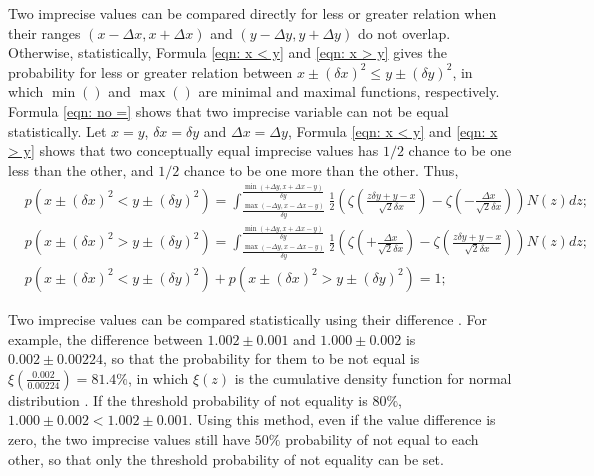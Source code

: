 \documentclass[twoside]{article}
\numberwithin{equation}{section}
\begin{document}
Two imprecise values can be compared directly for less or greater relation when their ranges $(x - \Delta x, x + \Delta x)$ and $(y - \Delta y, y + \Delta y)$ do not overlap. 
Otherwise, statistically, Formula \eqref{eqn: x < y} and \eqref{eqn: x > y} gives the probability for less or greater relation between $x \pm (\delta x)^2 \le y \pm (\delta y)^2$, in which $\min()$ and $\max()$ are minimal and maximal functions, respectively.
Formula \eqref{eqn: no =} shows that two imprecise variable can not be equal statistically.
Let $x = y$, $\delta x = \delta y$ and $\Delta x = \Delta y$, Formula \eqref{eqn: x < y} and \eqref{eqn: x > y} shows that two conceptually equal imprecise values has $1/2$ chance to be one less than the other, and $1/2$ chance to be one more than the other.
Thus,
\begin{align}
\label{eqn: x < y}
& p\left( x \pm (\delta x)^2 < y \pm (\delta y)^2 \right) = 
  \int_{\frac{\max(-\Delta y, x - \Delta x - y)}{\delta y}}^{\frac{\min(+\Delta y, x + \Delta x - y)}{\delta y}} 
      \frac{1}{2} \left(\zeta(\frac{z \delta y + y - x}{\sqrt{2} \delta x}) - \zeta(-\frac{\Delta x}{\sqrt{2} \delta x})\right) N(z) d z; \\
\label{eqn: x > y}
& p\left( x \pm (\delta x)^2 > y \pm (\delta y)^2 \right) =     
  \int_{\frac{\max(-\Delta y, x - \Delta x - y)}{\delta y}}^{\frac{\min(+\Delta y, x + \Delta x - y)}{\delta y}} 
      \frac{1}{2} \left(\zeta(+\frac{\Delta x}{\sqrt{2} \delta x}) - \zeta(\frac{z \delta y + y - x}{\sqrt{2} \delta x})\right) N(z) d z; \\
\label{eqn: no =}
& p\left( x \pm (\delta x)^2 < y \pm (\delta y)^2 \right) + p\left( x \pm (\delta x)^2 > y \pm (\delta y)^2 \right) = 1;
\end{align}

\fi

Two imprecise values can be compared statistically using their difference \cite{Statistical_Methods}.
For example, the difference between $1.002 \pm 0.001$ and $1.000 \pm 0.002$ is $0.002 \pm 0.00224$, so that the probability for them to be not equal is $\xi(\frac{0.002}{0.00224}) = 81.4\%$, in which $\xi(z)$ is the cumulative density function for normal distribution \cite{Probability_Statistics}.
If the threshold probability of not equality is $80\%$, $1.000 \pm 0.002 < 1.002 \pm 0.001$.
Using this method, even if the value difference is zero, the two imprecise values still have $50\%$ probability of not equal to each other, so that only the threshold probability of not equality can be set.
\end{document}
